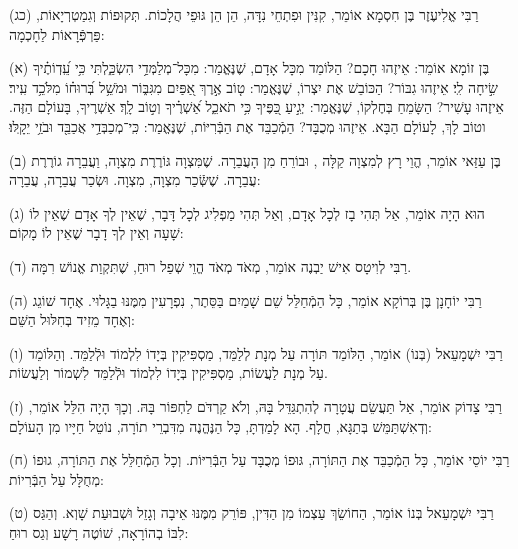\documentclass[twoside, openany, parskip=half, 11pt]{book}
\begin{document}
(כג)
רַבִּי אֱלִיעֶזֶר בֶּן חִסְמָא אוֹמֵר, קִנִּין וּפִתְחֵי נִדָּה, הֵן הֵן גּוּפֵי הֲלָכוֹת.
תְּקוּפוֹת וְגִמַטְרְיָאוֹת, פַּרְפְּֿרָאוֹת לַחָכְמָה:


\kolyisroel

(א)
בֶּן זוֹמָא אוֹמֵר:
אֵיזֶהוּ חָכָם? הַלּוֹמֵד מִכָּל אָדָם, שֶׁנֶּאֱמַר: מִכָּל־מְלַמְּדַ֥י הִשְׂכַּ֑לְתִּי כִּ֥י עֵֽ֝דְוֹתֶ֗יךָ שִׂ֣יחָה לִֽי׃
אֵיזֶהוּ גִבּוֹר? הַכּוֹבֵשׁ אֶת יִצְרוֹ, שֶׁנֶּאֱמַר: ט֤וֹב אֶ֣רֶךְ אַ֭פַּיִם מִגִּבּ֑וֹר וּמֹשֵׁ֥ל בְּ֝רוּח֗וֹ מִלֹּכֵ֥ד עִֽיר׃
אֵיזֶהוּ עָשִׁיר? הַשָּׂמֵחַ בְּחֶלְקוֹ, שֶׁנֶּאֱמַר: יְגִ֣יעַ כַּ֭פֶּיךָ כִּ֥י תֹאכֵ֑ל אַ֝שְׁרֶ֗יךָ וְט֣וֹב לָֽךְ׃ אַשְׁרֶיךָ, בָּעוֹלָם הַזֶּה. וטוֹב לָךְ, לָעוֹלָם הַבָּא.
אֵיזֶהוּ מְכֻבָּד? הַמְֿכַבֵּד אֶת הַבְּֿרִיּוֹת, שֶׁנֶּאֱמַר: כִּֽי־מְכַבְּדַ֥י אֲכַבֵּ֖ד וּבֹזַ֥י יֵקָֽלּוּ׃

(ב)
בֶּן עַזַּאי אוֹמֵר, הֱוֵי רָץ לְמִצְוָה קַלָּה , וּבוֹרֵחַ מִן הָעֲבֵרָה.
שֶׁמִּצְוָה גּוֹרֶרֶת מִצְוָה, וַעֲבֵרָה גוֹרֶרֶת עֲבֵרָה.
שֶׁשְּֿׂכַר מִצְוָה, מִצְוָה. וּשְׂכַר עֲבֵרָה, עֲבֵרָה:

(ג)
הוּא הָיָה אוֹמֵר, אַל תְּהִי בָז לְכָל אָדָם,
וְאַל תְּהִי מַפְלִיג לְכָל דָּבָר,
שֶׁאֵין לְךָ אָדָם שֶׁאֵין לוֹ שָׁעָה וְאֵין לְךָ דָבָר שֶׁאֵין לוֹ מָקוֹם:

(ד)
רַבִּי לְוִיטָס אִישׁ יַבְנֶה אוֹמֵר, מְאֹד מְאֹד הֱוֵי שְׁפַל רוּחַ, שֶׁתִּקְוַת אֱנוֹשׁ רִמָּה.

(ה)
 רַבִּי יוֹחָנָן בֶּן בְּרוֹקָא אוֹמֵר, כָּל הַמְֿחַלֵּל שֵׁם שָׁמַיִם בַּסֵּתֶר, נִפְרָעִין מִמֶּנּוּ בַגָּלוּי.
אֶחָד שׁוֹגֵג וְאֶחָד מֵזִיד בְּחִלּוּל הַשֵּׁם:

(ו)
רַבִּי יִשְׁמָעֵאל (בְּנוֹ) אוֹמֵר, הַלּוֹמֵד תּוֹרָה עַל מְנָת לְלַמֵּד, מַסְפִּיקִין בְּיָדוֹ לִלְמוֹד וּלְֿלַמֵּד.
וְהַלּוֹמֵד עַל מְנָת לַעֲשׂוֹת, מַסְפִּיקִין בְּיָדוֹ לִלְמוֹד וּלְֿלַמֵּד לִשְׁמוֹר וְלַעֲשׂוֹת.

(ז)
רַבִּי צָדוֹק אוֹמֵר, אַל תַּעֲשֵׂם עֲטָרָה לְהִתְגַּדֵּל בָּהּ, וְלֹא קַרְדֹּם לַחְפּוֹר בָּהּ.
וְכָךְ הָיָה הִלֵּל אוֹמֵר, וְדְאִשְׁתַּמֵּשׁ בְּתַגָּא, חֳלָף.
הָא לָמַדְתָּ, כָּל הַנֶּהֱנֶה מִדִּבְרֵי תוֹרָה, נוֹטֵל חַיָּיו מִן הָעוֹלָם:

(ח)
רַבִּי יוֹסֵי אוֹמֵר, כָּל הַמְֿכַבֵּד אֶת הַתּוֹרָה, גּוּפוֹ מְכֻבָּד עַל הַבְּֿרִיּוֹת.
וְכָל הַמְֿחַלֵּל אֶת הַתּוֹרָה, גוּפוֹ מְחֻלָּל עַל הַבְּֿרִיוֹת:

(ט)
רַבִּי יִשְׁמָעֵאל בְּנוֹ אוֹמֵר, הַחוֹשֵׂךְ עַצְמוֹ מִן הַדִּין, פּוֹרֵק מִמֶּנּוּ אֵיבָה וְגָזֵל וּשְׁבוּעַת שָׁוְא.
וְהַגַּס לִבּוֹ בְהוֹרָאָה, שׁוֹטֶה רָשָׁע וְגַס רוּחַ:
\end{document}
